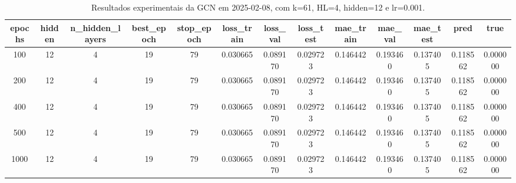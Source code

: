 \begin{table}[h]
\centering
\caption{Resultados experimentais da GCN em 2025-02-08, com k=61, HL=4, hidden=12 e lr=0.001.}
\label{tab:gcn_results_k61_hl4_h12_d20250208}
\begin{tabular}{ccccccccccccc}
\toprule
epochs & hidden & n\_hidden\_layers & best\_epoch & stop\_epoch & loss\_train & loss\_val & loss\_test & mae\_train & mae\_val & mae\_test & pred & true \\
\midrule
100 & 12 & 4 & 19 & 79 & 0.030665 & 0.089170 & 0.029723 & 0.146442 & 0.193460 & 0.137405 & 0.118562 & 0.000000 \\
200 & 12 & 4 & 19 & 79 & 0.030665 & 0.089170 & 0.029723 & 0.146442 & 0.193460 & 0.137405 & 0.118562 & 0.000000 \\
400 & 12 & 4 & 19 & 79 & 0.030665 & 0.089170 & 0.029723 & 0.146442 & 0.193460 & 0.137405 & 0.118562 & 0.000000 \\
500 & 12 & 4 & 19 & 79 & 0.030665 & 0.089170 & 0.029723 & 0.146442 & 0.193460 & 0.137405 & 0.118562 & 0.000000 \\
1000 & 12 & 4 & 19 & 79 & 0.030665 & 0.089170 & 0.029723 & 0.146442 & 0.193460 & 0.137405 & 0.118562 & 0.000000 \\
\bottomrule
\end{tabular}
\end{table}
